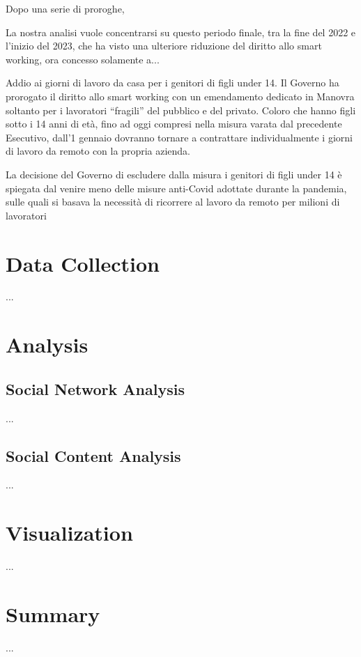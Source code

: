 \documentclass[12pt,journal,compsoc]{IEEEtran}
\begin{document}
Dopo una serie di proroghe, 

La nostra analisi vuole concentrarsi su questo periodo finale, tra la fine del 2022 e l'inizio del 2023, che ha visto una ulteriore riduzione del diritto allo smart working, ora concesso solamente a...

Addio ai giorni di lavoro da casa per i genitori di figli under 14. Il Governo ha prorogato il diritto allo smart working con un emendamento dedicato in Manovra soltanto per i lavoratori “fragili” del pubblico e del privato. Coloro che hanno figli sotto i 14 anni di età, fino ad oggi compresi nella misura varata dal precedente Esecutivo, dall’1 gennaio dovranno tornare a contrattare individualmente i giorni di lavoro da remoto con la propria azienda. 

La decisione del Governo di escludere dalla misura i genitori di figli under 14 è spiegata dal venire meno delle misure anti-Covid adottate durante la pandemia, sulle quali si basava la necessità di ricorrere al lavoro da remoto per milioni di lavoratori 




\section{Data Collection}
...

\section{Analysis}
\subsection{Social Network Analysis}
...

\subsection{Social Content Analysis}
...

\section{Visualization}
...

\section{Summary}
...


\nocite{*}
\printbibliography
\end{document}
